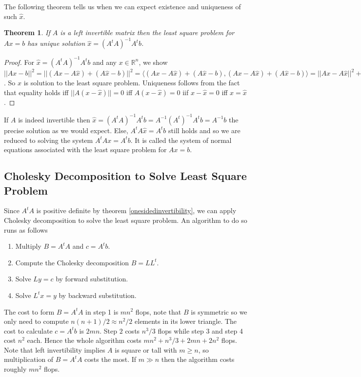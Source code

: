 \documentclass[12pt]{amsart}
\newtheorem{theorem}{Theorem}[section]
\theoremstyle{definition}
\begin{document}
The following theorem tells us when we can expect existence and uniqueness of such $\hat{x}$.

\begin{theorem}\label{} If $A$ is a left invertible matrix then the least square problem for $Ax = b$ has unique solution $\hat{x} = (A^tA)^{-1}A^t b$.
\end{theorem}
\begin{proof} For $\hat{x} = (A^tA)^{-1}A^t b$ and any $x \in \mathbb{R}^n$, we show $||Ax - b||^2 = ||(Ax - A\hat{x}) + (A\hat{x} - b)||^2 = \langle (Ax - A\hat{x}) + (A\hat{x} - b), (Ax - A\hat{x}) + (A\hat{x} - b) \rangle =  ||Ax - A\hat{x}||^2 + ||A\hat{x} - b||^2 + 2(Ax - A\hat{x})^t(A\hat{x} - b) = ||A(x - \hat{x})||^2 + ||A\hat{x} - b||^2 + 0 \geq ||A\hat{x} - b||^2$. So $\hat{x}$ is solution to the least square problem. Uniqueness follows from the fact that equality holds iff $||A(x - \hat{x})|| = 0$ iff $A(x - \hat{x}) = 0$ iif $x - \hat{x} = 0$ iff $x = \hat{x}$.
\end{proof}

If $A$ is indeed invertible then $\hat{x} = (A^tA)^{-1}A^t b = A^{-1}(A^t)^{-1} A^t b = A^{-1} b$ the precise solution as we would expect. Else, $A^tA \hat{x} = A^tb$ still holds and so we are reduced to solving the system $A^tAx = A^tb$. It is called the system of normal equations associated with the least square problem for $Ax = b$.

\subsection{Cholesky Decomposition to Solve Least Square Problem} Since $A^tA$ is positive definite by theorem \ref{onesidedinvertibility}, we can apply Cholesky decomposition to solve the least square problem. An algorithm to do so runs as follows
\begin{enumerate}[\indent 1.]
\item Multiply $B = A^tA$ and $c = A^t b$.
\item Compute the Cholesky decomposition $B = LL^t$.
\item Solve $Ly = c$ by forward substitution.
\item Solve $L^tx = y$ by backward substitution.
\end{enumerate}

The cost to form $B = A^tA$ in step 1 is $mn^2$ flops, note that $B$ is symmetric so we only need to compute $n(n+1) / 2 \approx n^2 / 2$ elements in its lower triangle. The cost to calculate $c = A^t b$ is $2mn$. Step $2$ costs $n^3 / 3$ flops while step 3 and step 4 cost $n^2$ each. Hence the whole algorithm costs $mn^2 + n^3 / 3 + 2mn + 2n^2$ flops. Note that left invertibility implies $A$ is square or tall with $m \geq n$, so multiplication of $B = A^tA$ costs the most. If $m \gg n$ then the algorithm costs roughly $mn^2$ flops.
\end{document}

